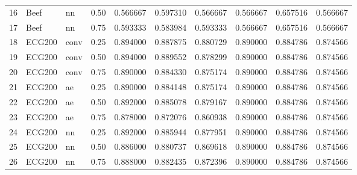 \begin{tabular}{lllrrrrrrr}
16 &      Beef &     nn &   0.50 &  0.566667 &     0.597310 &  0.566667 &  0.566667 &     0.657516 &  0.566667 \\
17 &      Beef &     nn &   0.75 &  0.593333 &     0.583984 &  0.593333 &  0.566667 &     0.657516 &  0.566667 \\
18 &    ECG200 &   conv &   0.25 &  0.894000 &     0.887875 &  0.880729 &  0.890000 &     0.884786 &  0.874566 \\
19 &    ECG200 &   conv &   0.50 &  0.894000 &     0.889552 &  0.878299 &  0.890000 &     0.884786 &  0.874566 \\
20 &    ECG200 &   conv &   0.75 &  0.890000 &     0.884330 &  0.875174 &  0.890000 &     0.884786 &  0.874566 \\
21 &    ECG200 &     ae &   0.25 &  0.890000 &     0.884148 &  0.875174 &  0.890000 &     0.884786 &  0.874566 \\
22 &    ECG200 &     ae &   0.50 &  0.892000 &     0.885078 &  0.879167 &  0.890000 &     0.884786 &  0.874566 \\
23 &    ECG200 &     ae &   0.75 &  0.878000 &     0.872076 &  0.860938 &  0.890000 &     0.884786 &  0.874566 \\
24 &    ECG200 &     nn &   0.25 &  0.892000 &     0.885944 &  0.877951 &  0.890000 &     0.884786 &  0.874566 \\
25 &    ECG200 &     nn &   0.50 &  0.886000 &     0.880737 &  0.869618 &  0.890000 &     0.884786 &  0.874566 \\
26 &    ECG200 &     nn &   0.75 &  0.888000 &     0.882435 &  0.872396 &  0.890000 &     0.884786 &  0.874566 \\
\bottomrule
\end{tabular}
